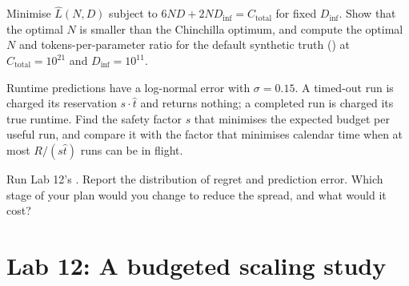 \begin{exercise}
Minimise $\hat L(N,D)$ subject to $6ND + 2ND_{\text{inf}} = C_{\text{total}}$ for fixed
$D_{\text{inf}}$. Show that the optimal $N$ is smaller than the Chinchilla optimum, and compute
the optimal $N$ and tokens-per-parameter ratio for the default synthetic truth
() at $C_{\text{total}}=10^{21}$ and $D_{\text{inf}}=10^{11}$.
\end{exercise}

\begin{exercise}
Runtime predictions have a log-normal error with $\sigma=0.15$. A timed-out run is charged its
reservation $s\cdot\hat t$ and returns nothing; a completed run is charged its true runtime.
Find the safety factor $s$ that minimises the expected budget per useful run, and compare it
with the factor that minimises calendar time when at most $R/(s\hat t)$ runs can be in flight.
\end{exercise}

\begin{exercise}
Run Lab 12's . Report the
distribution of regret and prediction error. Which stage of your plan would you change to
reduce the spread, and what would it cost?
\end{exercise}

\section{Lab 12: A budgeted scaling study}\label{sec:scalinglaws:lab}


